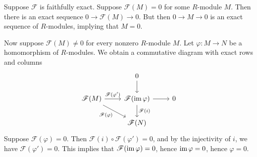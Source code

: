 \documentclass[../../master.tex]{subfiles}
\begin{document}
\begin{solution}
    Suppose $\mathscr{F}$ is faithfully exact.
    Suppose $\mathscr{F}(M) = 0$ for some $R$-module $M$.
    Then there is an exact sequence $0 \longrightarrow \mathscr{F}(M) \longrightarrow 0$.
    But then $0 \longrightarrow M \longrightarrow 0$ is an exact sequence of $R$-modules, implying that $M = 0$.

    Now suppose $\mathscr{F}(M) \neq 0$ for every nonzero $R$-module $M$.
    Let $\varphi : M \to N$ be a homomorphism of $R$-modules.
    We obtain a commutative diagram with exact rows and columns
    \[
    \begin{tikzcd}
	    & 0 \\
	    {\mathscr{F}(M)} & {\mathscr{F}(\im \varphi)} & 0 \\
	    & {\mathscr{F}(N)}
            \arrow["\mathscr{F}(\varphi')", from=2-1, to=2-2]
	    \arrow[from=2-2, to=2-3]
	    \arrow[from=1-2, to=2-2]
            \arrow["\mathscr{F}(i)", from=2-2, to=3-2]
            \arrow["\mathscr{F}(\varphi)"', from=2-1, to=3-2]
    \end{tikzcd}
    \]
    Suppose $\mathscr{F}(\varphi) = 0$.
    Then $\mathscr{F}(i) \circ \mathscr{F}(\varphi') = 0$, and by the injectivity of $i$, we have $\mathscr{F}(\varphi') = 0$.
    This implies that $\mathscr{F}(\operatorname{im} \varphi) = 0$, hence $\operatorname{im} \varphi = 0$, hence $\varphi = 0$.


\end{solution}
\end{document}

